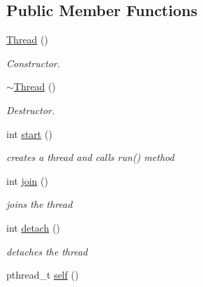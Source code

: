 \subsection*{Public Member Functions}
\begin{DoxyCompactItemize}
\item 
\hypertarget{class_thread_a95c703fb8f2f27cb64f475a8c940864a}{\hyperlink{class_thread_a95c703fb8f2f27cb64f475a8c940864a}{Thread} ()}\label{class_thread_a95c703fb8f2f27cb64f475a8c940864a}

\begin{DoxyCompactList}\small\item\em Constructor. \end{DoxyCompactList}\item 
\hypertarget{class_thread_a37d9edd3a1a776cbc27dedff949c9726}{\hyperlink{class_thread_a37d9edd3a1a776cbc27dedff949c9726}{$\sim$\-Thread} ()}\label{class_thread_a37d9edd3a1a776cbc27dedff949c9726}

\begin{DoxyCompactList}\small\item\em Destructor. \end{DoxyCompactList}\item 
\hypertarget{class_thread_a7d563f3201d081af8cc24ea552c6a4e4}{int \hyperlink{class_thread_a7d563f3201d081af8cc24ea552c6a4e4}{start} ()}\label{class_thread_a7d563f3201d081af8cc24ea552c6a4e4}

\begin{DoxyCompactList}\small\item\em creates a thread and calls run() method \end{DoxyCompactList}\item 
\hypertarget{class_thread_a7c3b04b32b4327923cc4c9553a403e32}{int \hyperlink{class_thread_a7c3b04b32b4327923cc4c9553a403e32}{join} ()}\label{class_thread_a7c3b04b32b4327923cc4c9553a403e32}

\begin{DoxyCompactList}\small\item\em joins the thread \end{DoxyCompactList}\item 
\hypertarget{class_thread_a2a08036a4598cfc554114fee9d0e8485}{int \hyperlink{class_thread_a2a08036a4598cfc554114fee9d0e8485}{detach} ()}\label{class_thread_a2a08036a4598cfc554114fee9d0e8485}

\begin{DoxyCompactList}\small\item\em detaches the thread \end{DoxyCompactList}\item 
\hypertarget{class_thread_ad4242a739c70bd1fe6b9c6e208714310}{pthread\-\_\-t \hyperlink{class_thread_ad4242a739c70bd1fe6b9c6e208714310}{self} ()}\label{class_thread_ad4242a739c70bd1fe6b9c6e208714310}


\end{DoxyCompactItemize}
